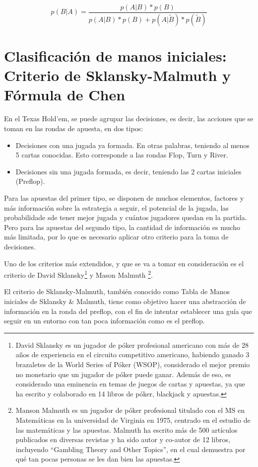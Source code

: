 \[p(B | A) = \frac{p(A|B)*p(B)}{p(A|B)*p(B) + p(A|\tilde{B})*p(\tilde{B})}\]

\section{Clasificación de manos iniciales: Criterio de Sklansky-Malmuth y Fórmula de Chen}
\label{sec:chen}

En el Texas Hold'em, se puede agrupar las decisiones, es decir, las acciones que se toman en las rondas de apuesta, en dos tipos:
\begin{itemize}
\item Decisiones con una jugada ya formada. En otras palabras, teniendo al menos 5 cartas conocidas. Esto corresponde a las rondas Flop, Turn y River.
\item Decisiones sin una jugada formada, es decir, teniendo las 2 cartas iniciales (Preflop).
\end{itemize}

Para las apuestas del primer tipo, se disponen de muchos elementos, factores y más información sobre la estrategia a seguir, el potencial de la jugada, las probabilidade sde tener mejor jugada y cuántos jugadores quedan en la partida. Pero para las apuestas del segundo tipo, la cantidad de información es mucho más limitada, por lo que es necesario aplicar otro criterio para la toma de decisiones.

Uno de los criterios más extendidos, y que se va a tomar en consideración es el criterio de David Sklansky\footnote{David Sklansky es un jugador de póker profesional americano con más de 28 años de experiencia en el circuito competitivo americano, habiendo ganado 3 brazaletes de la World Series of Póker (WSOP), considerado el mejor premio no monetario que un jugador de póker puede ganar. Además de eso, es considerado una eminencia en temas de juegos de cartas y apuestas, ya que ha escrito y colaborado en 14 libros de póker, blackjack y apuestas.} y Mason Malmuth \footnote{Manson Malmuth es un jugador de póker profesional titulado con el MS en Matemáticas en la universidad de Virginia en 1975, centrado en el estudio de las matemáticas y las apuestas. Malmuth ha escrito más de 500 artículos publicados en diversas revistas y ha sido autor y co-autor de 12 libros, incluyendo “Gambling Theory and Other Topics”, en el cual demuestra por qué tan pocas personas se les dan bien las apuestas.}. \cite{sklansky}

El criterio de Sklansky-Malmuth, también conocido como Tabla de Manos iniciales de Sklansky \& Malmuth, tiene como objetivo hacer una abstracción de información en la ronda del preflop, con el fin de intentar establecer una guía que seguir en un entorno con tan poca información como es el preflop. 

